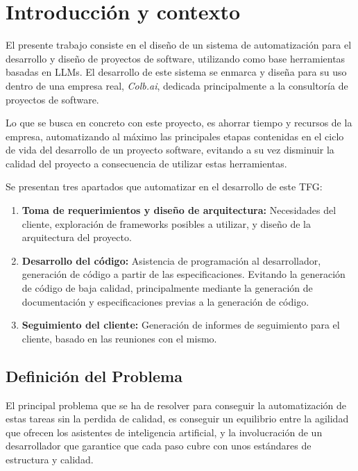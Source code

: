 \section{Introducción y contexto}
\label{sec:contexto}

El presente trabajo consiste en el diseño de un sistema de automatización para el desarrollo y diseño de proyectos de software, utilizando como base herramientas basadas en LLMs. El desarrollo de este sistema se enmarca y diseña para su uso dentro de una empresa real, \textit{Colb.ai}, dedicada principalmente a la consultoría de proyectos de software.

Lo que se busca en concreto con este proyecto, es ahorrar tiempo y recursos de la empresa, automatizando al máximo las principales etapas contenidas en el ciclo de vida del desarrollo de un proyecto software, evitando a su vez disminuir la calidad del proyecto a consecuencia de utilizar estas herramientas.

Se presentan tres apartados que automatizar en el desarrollo de este TFG:
\begin{enumerate}
    \item \textbf{Toma de requerimientos y diseño de arquitectura:} Necesidades del cliente, exploración de frameworks posibles a utilizar, y diseño de la arquitectura del proyecto.
    \item \textbf{Desarrollo del código:} Asistencia de programación al desarrollador, generación de código a partir de las especificaciones. Evitando la generación de código de baja calidad, principalmente mediante la generación de documentación y especificaciones previas a la generación de código.
    \item \textbf{Seguimiento del cliente:} Generación de informes de seguimiento para el cliente, basado en las reuniones con el mismo.
\end{enumerate}

\subsection{Definición del Problema}
\label{sec:definicion_problema}


El principal problema que se ha de resolver para conseguir la automatización de estas tareas sin la perdida de calidad, es conseguir un equilibrio entre la agilidad que ofrecen los asistentes de inteligencia artificial, y la involucración de un desarrollador que garantice que cada paso cubre con unos estándares de estructura y calidad.

